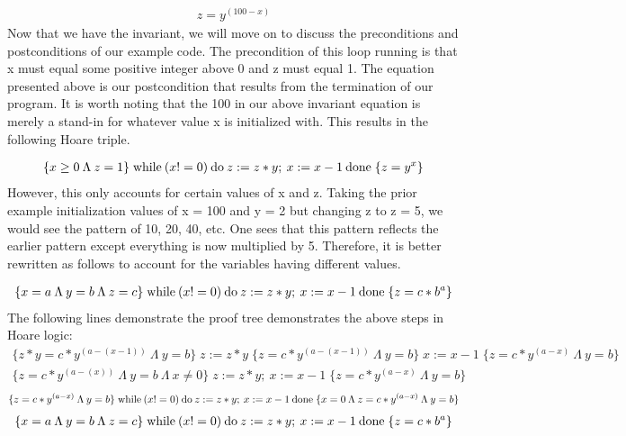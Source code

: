 \documentclass{article}
\theoremstyle{theorem}
\theoremstyle{definition}
\theoremstyle{remark}
\begin{document}
\begin{align*}
z = y^{(100 - x)}
\end{align*}
%
Now that we have the invariant, we will move on to discuss the preconditions and postconditions of our example code. The precondition of this loop running is that x must equal some positive integer above 0 and z must equal 1. The equation presented above is our postcondition that results from the termination of our program. It is worth noting that the 100 in our above invariant equation is merely a stand-in for whatever value x is initialized with. This results in the following Hoare triple.

\begin{align*}
\{x \ge 0 \: \Lambda \: z = 1\} \; {\rm while} \: (x!=0) \: {\rm do} \: z:=z*y; \: x:= x-1 \: {\rm done} \; \{z = y^x\}
\end{align*}
%
However, this only accounts for certain values of x and z. Taking the prior example initialization values of x = 100 and y = 2 but changing z to z =  5, we would see the pattern of 10, 20, 40, etc. One sees that this pattern reflects the earlier pattern except everything is now multiplied by 5. Therefore, it is better rewritten as follows to account for the variables having different values.

\begin{align*}
\{x = a \: \Lambda \: y = b \: \Lambda \: z = c\} \; {\rm while} \: (x!=0) \: {\rm do} \: z:=z*y; \: x:= x-1 \: {\rm done} \; \{z = c * b^a\}
\end{align*}
%
The following lines demonstrate the proof tree demonstrates the above steps in Hoare logic:
\begin{align*}
\{z*y = c * y^{(a - (x-1))} \: \Lambda \: y = b\} \; z:= z*y \; \{z = c * y^{(a - (x-1))} \: \Lambda \: y = b\} \; x:=x-1 \; \{z =c * y^{(a - x)} \: \Lambda \: y = b\}
\end{align*}
\begin{align*}
\{z = c * y^{(a - (x))} \: \Lambda \: y = b \: \Lambda \: x \neq 0\} \; z:= z*y; \: x:=x-1 \;  \{z =c * y^{(a - x)} \: \Lambda \: y = b\}
\end{align*}
\begin{align*}
 \{z =c * y^{(a - x)} \: \Lambda \: y = b\} \; {\rm while} \: (x!=0) \: {\rm do} \: z:=z*y; \: x:= x-1 \: {\rm done} \; \{x=0 \: \Lambda \: z =c * y^{(a - x)} \: \Lambda \: y = b\}
\end{align*}
\begin{align*}
\{x = a \: \Lambda \: y = b \: \Lambda \: z = c\} \; {\rm while} \: (x!=0) \: {\rm do} \: z:=z*y; \: x:= x-1 \: {\rm done} \; \{z = c * b^a\}
\end{align*}
\end{document}
